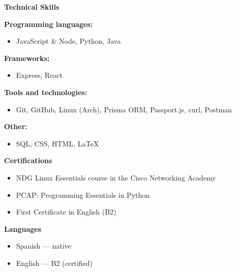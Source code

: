 \documentclass[a4paper,10pt]{article}
\newcommand{\cvsection}[1]{%
  \vspace{0.7em}
  \noindent\colorbox{modernblue!10}{\parbox{\dimexpr\linewidth-2\fboxsep}{\textbf{\large\color{modernblue} #1}}}
  \vspace{0.2em}
}
\begin{document}
\cvsection{Technical Skills}
\begin{tcolorbox}[colback=gray!5!white, colframe=gray!50!black, boxrule=0.2mm, arc=1mm, left=1mm, right=1mm, top=1mm, bottom=1mm, width=\textwidth]
\textbf{Programming languages:}
\begin{itemize}[leftmargin=0.7cm, label=]
    \item JavaScript \& Node, Python, Java
\end{itemize}
\textbf{Frameworks:}
\begin{itemize}[leftmargin=0.7cm, label=]
    \item Express, React
\end{itemize}
\textbf{Tools and technologies:}
\begin{itemize}[leftmargin=0.7cm, label=]
    \item Git, GitHub, Linux (Arch), Prisma ORM, Passport.js, curl, Postman
\end{itemize}
\textbf{Other:}
\begin{itemize}[leftmargin=0.7cm, label=]
    \item SQL, CSS, HTML, LaTeX
\end{itemize}
\end{tcolorbox}

\cvsection{Certifications}
\begin{itemize}[leftmargin=0.7cm, label=]
    \item NDG Linux Essentials course in the Cisco Networking Academy
    \item PCAP: Programming Essentials in Python
    \item First Certificate in English (B2)
\end{itemize}

\cvsection{Languages}
\begin{itemize}[leftmargin=0.7cm, label=]
    \item Spanish — native
    \item English — B2 (certified)
\end{itemize}





\end{document}
